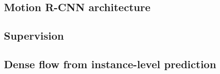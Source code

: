 
\subsection{Motion R-CNN architecture}
\subsection{Supervision}
\subsection{Dense flow from instance-level prediction}
